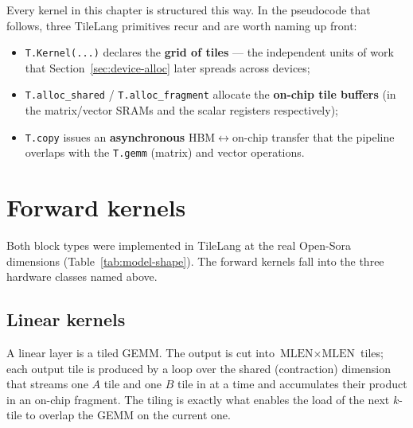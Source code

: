 \documentclass[11pt]{report}
\begin{document}
Every kernel in this chapter is structured this way. In the pseudocode that
follows, three TileLang primitives recur and are worth naming up front:

\begin{itemize}
\item \texttt{T.Kernel(...)} declares the \textbf{grid of tiles} --- the
independent units of work that Section~\ref{sec:device-alloc} later spreads
across devices;
\item \texttt{T.alloc\_shared} / \texttt{T.alloc\_fragment} allocate the
\textbf{on-chip tile buffers} (in the matrix/vector SRAMs and the scalar
registers respectively);
\item \texttt{T.copy} issues an \textbf{asynchronous} HBM$\leftrightarrow$on-chip
transfer that the pipeline overlaps with the \texttt{T.gemm} (matrix) and
vector operations.
\end{itemize}

\section{Forward kernels}
\label{sec:impl-forward}

Both block types were implemented in TileLang at the real Open-Sora
dimensions (Table~\ref{tab:model-shape}). The forward kernels fall into the
three hardware classes named above.

\subsection{Linear kernels}

A linear layer is a tiled GEMM. The output is cut into
$\text{MLEN}\times\text{MLEN}$ tiles; each output tile is produced by a loop
over the shared (contraction) dimension that streams one $A$ tile and one
$B$ tile in at a time and accumulates their product in an on-chip fragment.
The tiling is exactly what enables the load of the next $k$-tile to overlap
the GEMM on the current one.

\begin{algorithm}[H]
\DontPrintSemicolon
{}
\caption{Linear forward ($C = A B^\top + \text{bias}$), tiled and pipelined}
\end{algorithm}
\end{document}
